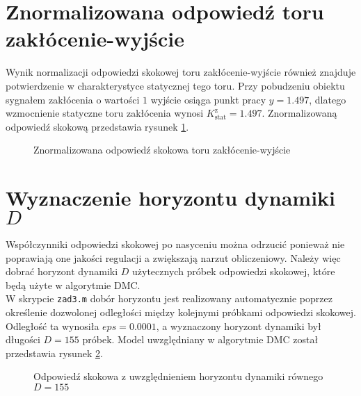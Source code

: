 \section{Znormalizowana odpowiedź toru zakłócenie-wyjście}
Wynik normalizacji odpowiedzi skokowej toru zakłócenie-wyjście również znajduje potwierdzenie
 w charakterystyce statycznej tego toru. Przy pobudzeniu obiektu sygnałem zakłócenia o wartości 
 $\num{1}$ wyjście osiąga punkt pracy $y = \num{1,497}$, dlatego wzmocnienie statyczne toru zakłócenia
 wynosi $K_{\mathrm{stat}}^{\mathrm{z}} = \num{1,497}$.
 Znormalizowaną odpowiedź skokową przedstawia rysunek \ref{zad3_norm_odp_d}.

\begin{figure}[b]
    \centering
    \caption{Znormalizowana odpowiedź skokowa toru zakłócenie-wyjście}
    \label{zad3_norm_odp_d}
\end{figure}
\FloatBarrier

\section{Wyznaczenie horyzontu dynamiki $D$}
\label{zad3_wyznacznie_D}
Współczynniki odpowiedzi skokowej po nasyceniu można odrzucić ponieważ nie poprawiają one jakości regulacji a zwiększają narzut obliczeniowy. Należy więc dobrać horyzont dynamiki $D$ użytecznych próbek odpowiedzi skokowej, które będą użyte w algorytmie DMC.\\
\indent{} W skrypcie \verb+zad3.m+ dobór horyzontu jest realizowany automatycznie poprzez określenie dozwolonej odległości między kolejnymi próbkami odpowiedzi skokowej. Odległość ta wynosiła $eps = \num{0,0001}$, a wyznaczony horyzont dynamiki był długości $D = \num{155}$ próbek. Model uwzględniany w algorytmie DMC został przedstawia rysunek \ref{zad3_cut_resp}.

\begin{figure}[b]
    \centering
    \caption{Odpowiedź skokowa z uwzględnieniem horyzontu dynamiki równego $D = 155$}
    \label{zad3_cut_resp}
\end{figure}

